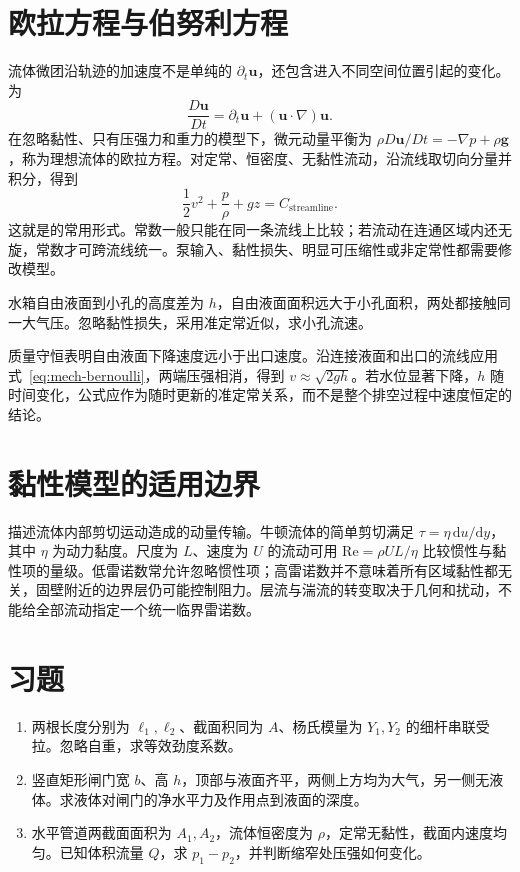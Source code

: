 \documentclass[UTF8,12pt,a4paper,fontset=fandol]{ctexbook}
\begin{document}
\section{欧拉方程与伯努利方程}
流体微团沿轨迹的加速度不是单纯的 $\partial_t\mathbf u$，还包含进入不同空间位置引起的变化。为
\[
 \frac{D\mathbf u}{Dt}=\partial_t\mathbf u+(\mathbf u\cdot\nabla)\mathbf u.
\]
在忽略黏性、只有压强力和重力的模型下，微元动量平衡为 $\rho D\mathbf u/Dt=-\nabla p+\rho\mathbf g$，称为理想流体的欧拉方程。对定常、恒密度、无黏性流动，沿流线取切向分量并积分，得到
\begin{equation}
 \frac12v^2+\frac p\rho+gz=C_{\mathrm{streamline}}.
 \label{eq:mech-bernoulli}
\end{equation}
这就是的常用形式。常数一般只能在同一条流线上比较；若流动在连通区域内还无旋，常数才可跨流线统一。泵输入、黏性损失、明显可压缩性或非定常性都需要修改模型。

\begin{example}[大水箱的小孔出流]
水箱自由液面到小孔的高度差为 $h$，自由液面面积远大于小孔面积，两处都接触同一大气压。忽略黏性损失，采用准定常近似，求小孔流速。
\end{example}
\begin{solve}
质量守恒表明自由液面下降速度远小于出口速度。沿连接液面和出口的流线应用式~\eqref{eq:mech-bernoulli}，两端压强相消，得到 $v\approx\sqrt{2gh}$。若水位显著下降，$h$ 随时间变化，公式应作为随时更新的准定常关系，而不是整个排空过程中速度恒定的结论。
\end{solve}

\section{黏性模型的适用边界}
描述流体内部剪切运动造成的动量传输。牛顿流体的简单剪切满足 $\tau=\eta\,\mathrm du/\mathrm dy$，其中 $\eta$ 为动力黏度。尺度为 $L$、速度为 $U$ 的流动可用 $\mathrm{Re}=\rho UL/\eta$ 比较惯性与黏性项的量级。低雷诺数常允许忽略惯性项；高雷诺数并不意味着所有区域黏性都无关，固壁附近的边界层仍可能控制阻力。层流与湍流的转变取决于几何和扰动，不能给全部流动指定一个统一临界雷诺数。

\section{习题}
\begin{enumerate}[label=\thechapter.\arabic*,ref=\thechapter.\arabic*]
\item\label{exr:mech-rods} 两根长度分别为 $\ell_1,\ell_2$、截面积同为 $A$、杨氏模量为 $Y_1,Y_2$ 的细杆串联受拉。忽略自重，求等效劲度系数。
\item\label{exr:mech-dam} 竖直矩形闸门宽 $b$、高 $h$，顶部与液面齐平，两侧上方均为大气，另一侧无液体。求液体对闸门的净水平力及作用点到液面的深度。
\item\label{exr:mech-pipe} 水平管道两截面面积为 $A_1,A_2$，流体恒密度为 $\rho$，定常无黏性，截面内速度均匀。已知体积流量 $Q$，求 $p_1-p_2$，并判断缩窄处压强如何变化。
\end{enumerate}
\end{document}
